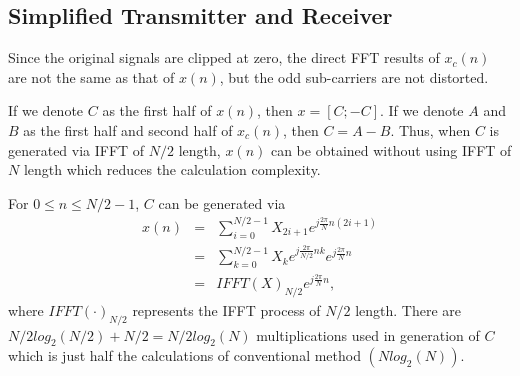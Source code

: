 \documentclass[10pt,journal]{IEEEtran}
\begin{document}
	\subsection{Simplified Transmitter and Receiver}
		Since the original signals are clipped at zero, the direct FFT results of $ x_c(n) $ are not the same as that of $ x(n) $, but the odd sub-carriers are not distorted. %

		If we denote $ C $ as the first half of $ x(n) $, then $ x=[C;-C] $. If we denote $ A $ and $ B $ as the first half and second half of $ x_c(n) $, then $ C = A - B $. Thus, when $ C $ is generated via IFFT of $ N/2 $ length, $ x(n) $ can be obtained without using IFFT of $ N $ length which reduces the calculation complexity.

		For $ 0\leq n \leq N/2-1 $, $ C $ can be generated via
		\begin{eqnarray}\label{equ:sim_transmitter}
			x(n) &=& \sum_{i=0}^{N/2-1} X_{2i+1}e^{j\frac{2\pi}{N}n(2i+1)} \nonumber\\
				 &=& \sum_{k=0}^{N/2-1} X_{k} e^{j\frac{2\pi}{N/2}nk}e^{j\frac{2\pi}{N}n} \nonumber\\
				 &=& IFFT(X)_{N/2}e^{j\frac{2\pi}{N}n},
		\end{eqnarray}
		where $ IFFT(\cdot)_{N/2} $	represents the IFFT process of $ N/2 $ length.	There are $ N/2 log_2(N/2) + N/2 = N/2 log_2(N) $ multiplications used in generation of $ C $ which is just  half the calculations of conventional method $( N log_2(N) )$.
\end{document}

